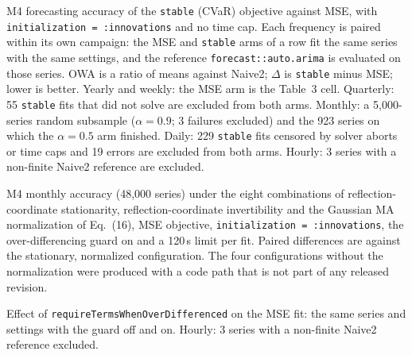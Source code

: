 
\caption{M4 forecasting accuracy of the \texttt{stable} (CVaR) objective against MSE, with
\texttt{initialization = :innovations} and no time cap. Each frequency is paired within its own
campaign: the MSE and \texttt{stable} arms of a row fit the same series with the same settings,
and the reference \texttt{forecast::auto.arima} is evaluated on those series. OWA is a ratio of
means against Naive2; $\Delta$ is \texttt{stable} minus MSE; lower is better. Yearly and weekly:
the MSE arm is the Table~3 cell. Quarterly: 55 \texttt{stable} fits that did not solve are
excluded from both arms. Monthly: a 5{,}000-series random subsample ($\alpha=0.9$; 3 failures
excluded) and the 923 series on which the $\alpha=0.5$ arm finished. Daily: 229 \texttt{stable}
fits censored by solver aborts or time caps and 19 errors are excluded from both arms. Hourly: 3
series with a non-finite Naive2 reference are excluded.}
\label{tab:stable}

\caption{M4 monthly accuracy (48{,}000 series) under the eight combinations of
reflection-coordinate stationarity, reflection-coordinate invertibility and the Gaussian MA
normalization of Eq.~(16), MSE objective, \texttt{initialization = :innovations}, the
over-differencing guard on and a 120\,s limit per fit. Paired differences are against the
stationary, normalized configuration. The four configurations without the normalization were
produced with a code path that is not part of any released revision.}
\label{tab:admissibility}

\caption{Effect of \texttt{requireTermsWhenOverDifferenced} on the MSE fit: the same series and
settings with the guard off and on. Hourly: 3 series with a non-finite Naive2 reference excluded.}
\label{tab:guard}
